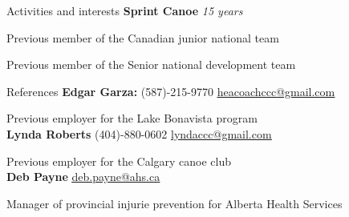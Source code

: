 \documentclass{resume}
\begin{document}
\begin{rSection}{Activities and interests}
	{\bf Sprint Canoe} {\em 15 years}
\item {Previous member of the Canadian junior national team}
\item {Previous member of the Senior national development team}
\end{rSection}

\begin{rSection}{References}
	{\bf Edgar Garza:} {(587)-215-9770} \underline{\href{mailto:heacoachccc@gmail.com}{heacoachccc@gmail.com}}
\item Previous employer for the Lake Bonavista program\\

	{\bf Lynda Roberts}  {(404)-880-0602 } \underline{\href{mailto:lyndaccc@gmail.com}{lyndaccc@gmail.com}}
\item Previous employer for the Calgary canoe club\\

	{\bf Deb Payne} \underline{\href{mailto:deb.payne@ahs.ca}{deb.payne@ahs.ca}}
\item Manager of provincial injurie prevention for Alberta Health Services\\
\end{rSection}
\end{document}
